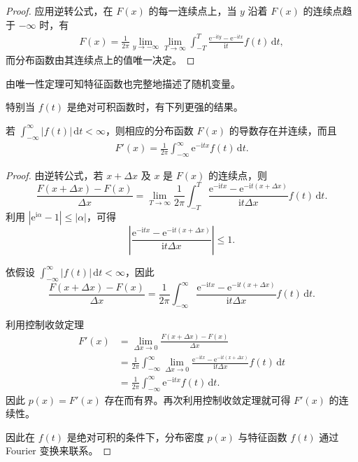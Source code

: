 \documentclass[../../main.tex]{subfiles}
\begin{document}
\begin{proof}
应用逆转公式，在 $F(x)$ 的每一连续点上，当 $y$ 沿着 $F(x)$ 的连续点趋于 $-\infty$ 时，有
\begin{align}
F(x)=\frac{1}{2\pi}\lim_{y\to-\infty}\lim_{T\to\infty}\int_{-T}^T\frac{\mathrm{e}^{-\mathrm{i}ty}-\mathrm{e}^{-\mathrm{i}tx}}{\mathrm{i}t}f(t)\,\mathrm{d}t,\label{align:ch04-分布函数由特征函数}
\end{align}
而分布函数由其连续点上的值唯一决定。
\end{proof}

由唯一性定理可知特征函数也完整地描述了随机变量。

特别当 $f(t)$ 是绝对可积函数时，有下列更强的结果。

\begin{theorem}[密度的反演]\label{theorem:ch04-密度反演}
若 $\int_{-\infty}^{\infty}|f(t)|\,\mathrm{d}t<\infty$，则相应的分布函数 $F(x)$ 的导数存在并连续，而且
\begin{align}
F'(x)=\frac{1}{2\pi}\int_{-\infty}^{\infty}\mathrm{e}^{-\mathrm{i}tx}f(t)\,\mathrm{d}t.\label{align:ch04-密度反演公式}
\end{align}
\end{theorem}

\begin{proof}
由逆转公式，若 $x+\Delta x$ 及 $x$ 是 $F(x)$ 的连续点，则
\[
\frac{F(x+\Delta x)-F(x)}{\Delta x}
=\lim_{T\to\infty}\frac{1}{2\pi}\int_{-T}^T\frac{\mathrm{e}^{-\mathrm{i}tx}-\mathrm{e}^{-\mathrm{i}t(x+\Delta x)}}{\mathrm{i}t\Delta x}f(t)\,\mathrm{d}t.
\]
利用 $|\mathrm{e}^{\mathrm{i}\alpha}-1|\leqslant|\alpha|$，可得
\[
\left|\frac{\mathrm{e}^{-\mathrm{i}tx}-\mathrm{e}^{-\mathrm{i}t(x+\Delta x)}}{\mathrm{i}t\Delta x}\right|\leqslant 1.
\]

依假设 $\int_{-\infty}^{\infty}|f(t)|\,\mathrm{d}t<\infty$，因此
\[
\frac{F(x+\Delta x)-F(x)}{\Delta x}
=\frac{1}{2\pi}\int_{-\infty}^{\infty}\frac{\mathrm{e}^{-\mathrm{i}tx}-\mathrm{e}^{-\mathrm{i}t(x+\Delta x)}}{\mathrm{i}t\Delta x}f(t)\,\mathrm{d}t.
\]

利用控制收敛定理
\begin{align*}
F'(x)&=\lim_{\Delta x\to 0}\frac{F(x+\Delta x)-F(x)}{\Delta x}\\
&=\frac{1}{2\pi}\int_{-\infty}^{\infty}\lim_{\Delta x\to 0}\frac{\mathrm{e}^{-\mathrm{i}tx}-\mathrm{e}^{-\mathrm{i}t(x+\Delta x)}}{\mathrm{i}t\Delta x}f(t)\,\mathrm{d}t\\
&=\frac{1}{2\pi}\int_{-\infty}^{\infty}\mathrm{e}^{-\mathrm{i}tx}f(t)\,\mathrm{d}t.
\end{align*}
因此 $p(x)=F'(x)$ 存在而有界。再次利用控制收敛定理就可得 $F'(x)$ 的连续性。

因此在 $f(t)$ 是绝对可积的条件下，分布密度 $p(x)$ 与特征函数 $f(t)$ 通过 Fourier 变换来联系。
\end{proof}
\end{document}
